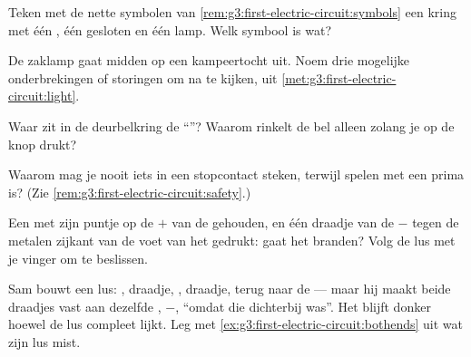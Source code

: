 \begin{exercise}[$\star$]\label{exo:g3:first-electric-circuit:5}
Teken met de nette symbolen van
\cref{rem:g3:first-electric-circuit:symbols} een kring met één
, één gesloten  en één lamp. Welk symbool is wat?
\end{exercise}

\begin{exercise}[$\star$]\label{exo:g3:first-electric-circuit:6}
De zaklamp gaat midden op een kampeertocht uit. Noem drie mogelijke
onderbrekingen of storingen om na te kijken, uit
\cref{met:g3:first-electric-circuit:light}.
\end{exercise}

\begin{exercise}[$\star$]\label{exo:g3:first-electric-circuit:7}
Waar zit in de deurbelkring de ``''? Waarom rinkelt de bel
alleen zolang je op de knop drukt?
\end{exercise}

\begin{exercise}[$\star$]\label{exo:g3:first-electric-circuit:8}
Waarom mag je nooit iets in een stopcontact steken, terwijl spelen met
een  prima is? (Zie
\cref{rem:g3:first-electric-circuit:safety}.)
\end{exercise}

\begin{exercise}[$\star$]\label{exo:g3:first-electric-circuit:9}
Een  met zijn puntje op de $+$ van de 
gehouden, en één draadje van de $-$ tegen de metalen zijkant van
de voet van het  gedrukt: gaat het branden? Volg de lus met je
vinger om te beslissen.
\end{exercise}

\begin{exercise}[$\star\star$]\label{exo:g3:first-electric-circuit:10}
Sam bouwt een lus: , draadje, , draadje, terug naar de
 --- maar hij maakt beide draadjes vast aan dezelfde
, $-$, ``omdat die dichterbij was''. Het  blijft donker
hoewel de lus compleet lijkt. Leg met
\cref{ex:g3:first-electric-circuit:bothends} uit wat zijn lus mist.
\end{exercise}

